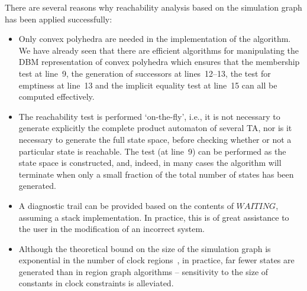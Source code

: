 {There are several reasons why reachability analysis based on the simulation
graph has been applied successfully:
\begin{itemize}
\item Only convex polyhedra are needed in the implementation of the algorithm.
  We have already seen that there are efficient algorithms for manipulating
  the DBM representation of convex polyhedra which ensures that the 
  membership test at line~9, the generation of successors at lines~12--13,
  the test for emptiness at line~13 and the implicit equality test at line~15
  can all be computed effectively.
\item The reachability test is performed `on-the-fly', i.e., it is not 
  necessary to generate explicitly the complete product automaton of
  several TA, nor is it necessary to generate the full state space,
  before checking whether or not a particular state is reachable. The
  test (at line~9) can be performed as the state space is constructed,
  and, indeed, in many cases the algorithm will terminate when only a
  small fraction of the total number of states has been generated.
\item A diagnostic trail can be provided based on the contents
  of $WAITING$, assuming a stack implementation. In practice, this is
  of great assistance to the user in the modification of an
  incorrect system.
\item Although the theoretical bound on the size of the simulation
  graph is exponential in the number of clock regions~\cite{acd:92},
  in practice, far fewer states are generated than in region graph
  algorithms -- sensitivity to the size of constants in clock
  constraints is alleviated.
\end{itemize}

}
